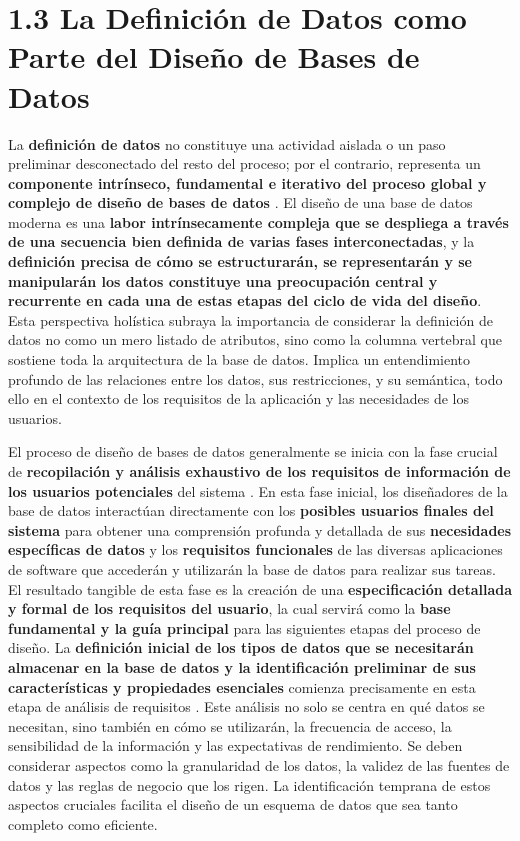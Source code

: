 \section{1.3 La Definición de Datos como Parte del Diseño de Bases de Datos}

La \textbf{definición de datos} no constituye una actividad aislada o un paso preliminar desconectado del resto del proceso; por el contrario, representa un \textbf{componente intrínseco, fundamental e iterativo del proceso global y complejo de diseño de bases de datos} \cite{Fundamentos-de-Sistemas-de-Bases-de-Datos.pdf:59, 61, FBD_1.pdf:1}. El diseño de una base de datos moderna es una \textbf{labor intrínsecamente compleja que se despliega a través de una secuencia bien definida de varias fases interconectadas}, y la \textbf{definición precisa de cómo se estructurarán, se representarán y se manipularán los datos constituye una preocupación central y recurrente en cada una de estas etapas del ciclo de vida del diseño}. Esta perspectiva holística subraya la importancia de considerar la definición de datos no como un mero listado de atributos, sino como la columna vertebral que sostiene toda la arquitectura de la base de datos. Implica un entendimiento profundo de las relaciones entre los datos, sus restricciones, y su semántica, todo ello en el contexto de los requisitos de la aplicación y las necesidades de los usuarios.

El proceso de diseño de bases de datos generalmente se inicia con la fase crucial de \textbf{recopilación y análisis exhaustivo de los requisitos de información de los usuarios potenciales} del sistema \cite{Fundamentos-de-Sistemas-de-Bases-de-Datos.pdf:59, FBD_1.pdf:1}. En esta fase inicial, los diseñadores de la base de datos interactúan directamente con los \textbf{posibles usuarios finales del sistema} para obtener una comprensión profunda y detallada de sus \textbf{necesidades específicas de datos} y los \textbf{requisitos funcionales} de las diversas aplicaciones de software que accederán y utilizarán la base de datos para realizar sus tareas. El resultado tangible de esta fase es la creación de una \textbf{especificación detallada y formal de los requisitos del usuario}, la cual servirá como la \textbf{base fundamental y la guía principal} para las siguientes etapas del proceso de diseño.  La \textbf{definición inicial de los tipos de datos que se necesitarán almacenar en la base de datos y la identificación preliminar de sus características y propiedades esenciales} comienza precisamente en esta etapa de análisis de requisitos \cite{Fundamentos-de-Sistemas-de-Bases-de-Datos.pdf:59}. Este análisis no solo se centra en qué datos se necesitan, sino también en cómo se utilizarán, la frecuencia de acceso, la sensibilidad de la información y las expectativas de rendimiento. Se deben considerar aspectos como la granularidad de los datos, la validez de las fuentes de datos y las reglas de negocio que los rigen. La identificación temprana de estos aspectos cruciales facilita el diseño de un esquema de datos que sea tanto completo como eficiente.

